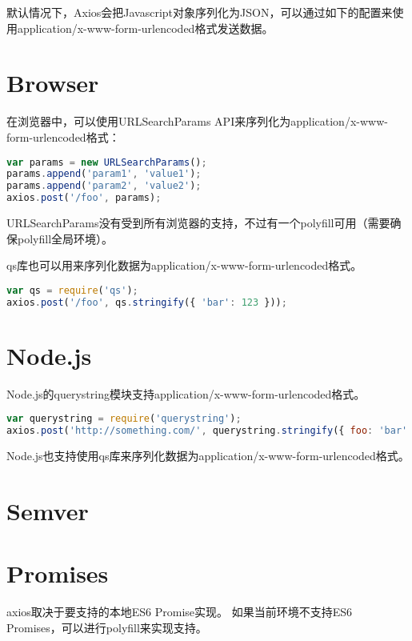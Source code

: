 默认情况下，Axios会把Javascript对象序列化为JSON，可以通过如下的配置来使用application/x-www-form-urlencoded格式发送数据。

\section{Browser}

在浏览器中，可以使用URLSearchParams API来序列化为application/x-www-form-urlencoded格式：

\begin{lstlisting}[language=JavaScript]
var params = new URLSearchParams();
params.append('param1', 'value1');
params.append('param2', 'value2');
axios.post('/foo', params); 
\end{lstlisting}

URLSearchParams没有受到所有浏览器的支持，不过有一个polyfill可用（需要确保polyfill全局环境）。

qs库也可以用来序列化数据为application/x-www-form-urlencoded格式。

\begin{lstlisting}[language=JavaScript]
var qs = require('qs');
axios.post('/foo', qs.stringify({ 'bar': 123 }));
\end{lstlisting}

\section{Node.js}

Node.js的querystring模块支持application/x-www-form-urlencoded格式。



\begin{lstlisting}[language=JavaScript]
var querystring = require('querystring');
axios.post('http://something.com/', querystring.stringify({ foo: 'bar' });
\end{lstlisting}

Node.js也支持使用qs库来序列化数据为application/x-www-form-urlencoded格式。

\section{Semver}


\section{Promises}

axios取决于要支持的本地ES6 Promise实现。 如果当前环境不支持ES6 Promises，可以进行polyfill来实现支持。

